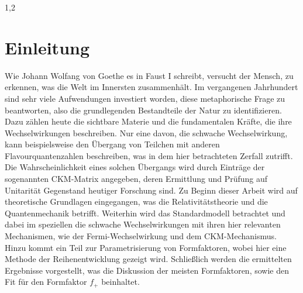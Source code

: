 \documentclass[11pt,a4paper,twoside]{report}
\begin{document}
\begin{spacing}{1,2}
\chapter{Einleitung}
Wie Johann Wolfang von Goethe es in Faust I schreibt, versucht der Mensch, zu erkennen, was die Welt im Innersten zusammenhält. Im vergangenen Jahrhundert
sind sehr viele Aufwendungen investiert worden, diese metaphorische Frage zu beantworten, also die grundlegenden Bestandteile der Natur zu identifizieren.
Dazu zählen heute die sichtbare Materie und die fundamentalen Kräfte, die ihre Wechselwirkungen beschreiben. Nur eine davon, die schwache Wechselwirkung, kann
beispielsweise den Übergang von Teilchen mit anderen Flavourquantenzahlen beschreiben, was in dem hier betrachteten Zerfall zutrifft. Die Wahrscheinlichkeit
eines solchen Übergangs wird durch Einträge der sogenannten CKM-Matrix angegeben, deren Ermittlung und Prüfung auf Unitarität Gegenstand heutiger Forschung
sind. Zu Beginn dieser Arbeit wird auf theoretische Grundlagen eingegangen, was die Relativitätstheorie und die Quantenmechanik betrifft. Weiterhin wird
das Standardmodell betrachtet und dabei im speziellen die schwache Wechselwirkungen mit ihren hier relevanten Mechanismen, wie der Fermi-Wechselwirkung und
dem CKM-Mechanismus. Hinzu kommt ein Teil zur Parametrisierung von Formfaktoren, wobei hier eine Methode der Reihenentwicklung gezeigt wird. Schließlich
werden die ermittelten Ergebnisse vorgestellt, was die Diskussion der meisten Formfaktoren, sowie den Fit für den Formfaktor $f_+$ beinhaltet.

\end{spacing}
\end{document}
